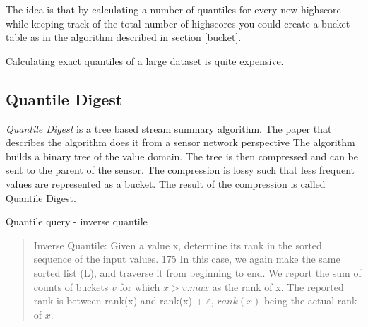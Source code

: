 The idea is that by calculating a number of quantiles for every new highscore while keeping track of the total number of highscores you could create a bucket-table as in the algorithm described in section \ref{bucket}.

Calculating exact quantiles of a large dataset is quite expensive.

\subsection{Quantile Digest}

\emph{Quantile Digest} is a tree based stream summary algorithm. The paper that describes the algorithm does it from a sensor network perspective 
The algorithm builds a binary tree of the value domain. The tree is then compressed and can be sent to the parent of the sensor. The compression is lossy such that less frequent values are represented as a bucket. The result of the compression is called Quantile Digest.

Quantile query - inverse quantile

\blockquote{

Inverse Quantile: Given a value x, determine its
rank in the sorted sequence of the input values.
175
In this case, we again make the same sorted list (L),
and traverse it from beginning to end. We report the
sum of counts of buckets $v$ for which $x > v.max$ as
the rank of x. The reported rank is between rank(x)
and rank(x) + $\varepsilon$, $rank(x)$ being the actual rank of
$x$.}

\fi
